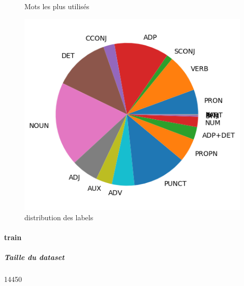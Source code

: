\begin{figure}[H]
\begin{minipage}{0.48\textwidth}
\begin{tabular}{|l || *{11 }{|c} |}
\end{tabular}
\caption{ Mots les plus utilisés } \label{Fig:muw}\end{minipage} 
\begin{minipage}{0.48\textwidth} \centering
\label{Fig:gsdtest_img.png}
\caption{distribution des labels}\includegraphics[width=.7\linewidth]{gsdtest_img.png}

\end{minipage}
\end{figure}\paragraph{train}
\subparagraph{Taille du dataset}14450
